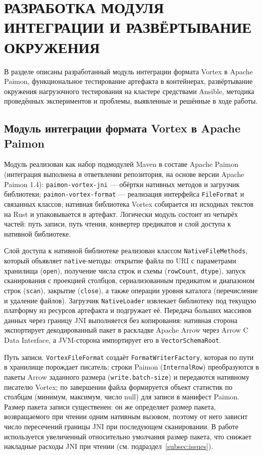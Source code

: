 \section{РАЗРАБОТКА МОДУЛЯ ИНТЕГРАЦИИ И РАЗВЁРТЫВАНИЕ ОКРУЖЕНИЯ}

В разделе описаны разработанный модуль интеграции формата Vortex в Apache Paimon,
функциональное тестирование артефакта в контейнерах, развёртывание окружения
нагрузочного тестирования на кластере средствами Ansible, методика проведённых
экспериментов и проблемы, выявленные и решённые в ходе работы.

\subsection{Модуль интеграции формата Vortex в Apache Paimon}

Модуль реализован как набор подмодулей Maven в составе Apache Paimon (интеграция
выполнена в ответвлении репозитория, на основе версии Apache Paimon 1.4):
\texttt{paimon-vortex-jni} --- обёртки нативных методов и загрузчик библиотеки;
\texttt{paimon-vortex-format} --- реализация интерфейса \texttt{FileFormat} и
связанных классов; нативная библиотека Vortex собирается из исходных текстов на
Rust и упаковывается в артефакт. Логически модуль состоит из четырёх частей: путь
записи, путь чтения, конвертер предикатов и слой доступа к нативной библиотеке.

Слой доступа к нативной библиотеке реализован классом \texttt{NativeFileMethods},
который объявляет \texttt{native}-методы: открытие файла по URI с параметрами хранилища
(\texttt{open}), получение числа строк и схемы (\texttt{rowCount}, \texttt{dtype}),
запуск сканирования с проекцией столбцов, сериализованным предикатом и диапазоном
строк (\texttt{scan}), закрытие (\texttt{close}), а также операции уровня каталога
(перечисление и удаление файлов). Загрузчик \texttt{NativeLoader} извлекает
библиотеку под текущую платформу из ресурсов артефакта и подгружает её. Передача
больших массивов данных через границу JNI выполняется без копирования: нативная
сторона экспортирует декодированный пакет в раскладке Apache Arrow через Arrow C
Data Interface, а JVM-сторона импортирует его в \texttt{VectorSchemaRoot}.

Путь записи. \texttt{VortexFileFormat} создаёт \texttt{FormatWriterFactory},
которая по пути в хранилище порождает писатель: строки Paimon (\texttt{InternalRow})
преобразуются в пакеты Arrow заданного размера (\texttt{write.batch-size}) и
передаются нативному писателю Vortex; по завершении файла формируется объект
статистик по столбцам (минимум, максимум, число null) для записи в манифест Paimon.
Размер пакета записи существенен: он же определяет размер пакета, возвращаемого при
чтении одним нативным вызовом, поэтому от него зависит число пересечений границы JNI
при последующем сканировании. В работе используется увеличенный относительно
умолчания размер пакета, что снижает накладные расходы JNI при чтении (см.
подраздел~\ref{subsec:issues}).

